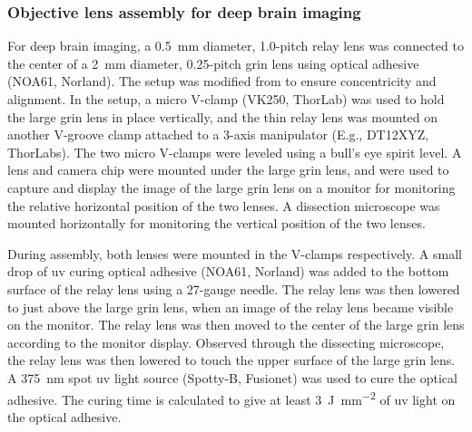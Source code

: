 \subsubsection{Objective lens assembly for deep brain imaging} \label{objective-assembly}

For deep brain imaging, a \SI{0.5}{\mm} diameter, 1.0-pitch relay lens was connected to the center of a \SI{2}{\mm} diameter, 0.25-pitch \gls{grin} lens using optical adhesive (NOA61, Norland). The setup was modified from \citep{kim12} to ensure concentricity and alignment. In the setup, a micro V-clamp (VK250, ThorLab) was used to hold the large \gls{grin} lens in place vertically, and the thin relay lens was mounted on another V-groove clamp attached to a 3-axis manipulator (E.g., DT12XYZ, ThorLabs). The two micro V-clamps were leveled using a bull's eye spirit level. A lens and camera chip were mounted under the large \gls{grin} lens, and were used to capture and display the image of the large \gls{grin} lens on a monitor for monitoring the relative horizontal position of the two lenses. A dissection microscope was mounted horizontally for monitoring the vertical position of the two lenses. 


During assembly, both lenses were mounted in the V-clamps respectively. A small drop of \gls{uv} curing optical adhesive (NOA61, Norland) was added to the bottom surface of the relay lens using a 27-gauge needle. The relay lens was then lowered to just above the large \gls{grin} lens, when an image of the relay lens became visible on the monitor. The relay lens was then moved to the center of the large \gls{grin} lens according to the monitor display. Observed through the dissecting microscope, the relay lens was then lowered to touch the upper surface of the large \gls{grin} lens. A \SI{375}{\nm} spot \gls{uv} light source (Spotty-B, Fusionet) was used to cure the optical adhesive. The curing time is calculated to give at least \SI{3}{\J\per\mm\squared} of \gls{uv} light on the optical adhesive. 


